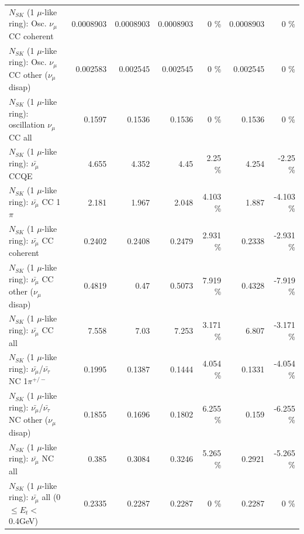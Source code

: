 \begin{table}
\begin{tabular}{| l | r | r | r  r | r  r |}
                        $N_{SK}$ (1 $\mu$-like ring): Osc. $\nu_\mu$ CC coherent &       0.0008903 &       0.0008903 &       0.0008903 &        0 \%  &       0.0008903 &        0 \%  \\ 
         $N_{SK}$ (1 $\mu$-like ring): Osc. $\nu_\mu$ CC other ($\nu_\mu$ disap) &        0.002583 &        0.002545 &        0.002545 &        0 \%  &        0.002545 &        0 \%  \\ 
                      $N_{SK}$ (1 $\mu$-like ring): oscillation $\nu_\mu$ CC all &          0.1597 &          0.1536 &          0.1536 &        0 \%  &          0.1536 &        0 \%  \\ 
\hline
\hline
                              $N_{SK}$ (1 $\mu$-like ring): $\bar{\nu_\mu}$ CCQE &           4.655 &           4.352 &            4.45 &     2.25 \%  &           4.254 &    -2.25 \%  \\ 
                         $N_{SK}$ (1 $\mu$-like ring): $\bar{\nu_\mu}$ CC 1$\pi$ &           2.181 &           1.967 &           2.048 &    4.103 \%  &           1.887 &   -4.103 \%  \\ 
                       $N_{SK}$ (1 $\mu$-like ring): $\bar{\nu_\mu}$ CC coherent &          0.2402 &          0.2408 &          0.2479 &    2.931 \%  &          0.2338 &   -2.931 \%  \\ 
        $N_{SK}$ (1 $\mu$-like ring): $\bar{\nu_\mu}$ CC other ($\nu_\mu$ disap) &          0.4819 &            0.47 &          0.5073 &    7.919 \%  &          0.4328 &   -7.919 \%  \\ 
                          $N_{SK}$ (1 $\mu$-like ring): $\bar{\nu_{\mu}}$ CC all &           7.558 &            7.03 &           7.253 &    3.171 \%  &           6.807 &   -3.171 \%  \\ 
\hline
  $N_{SK}$ (1 $\mu$-like ring): $\bar{\nu_\mu}$/$\bar{\nu_\tau}$ NC 1$\pi^{+/-}$ &          0.1995 &          0.1387 &          0.1444 &    4.054 \%  &          0.1331 &   -4.054 \%  \\ 
$N_{SK}$ (1 $\mu$-like ring): $\bar{\nu_\mu}$/$\bar{\nu_\tau}$ NC other ($\nu_\mu$ disap) &          0.1855 &          0.1696 &          0.1802 &    6.255 \%  &           0.159 &   -6.255 \%  \\ 
                          $N_{SK}$ (1 $\mu$-like ring): $\bar{\nu_{\mu}}$ NC all &           0.385 &          0.3084 &          0.3246 &    5.265 \%  &          0.2921 &   -5.265 \%  \\ 
\hline
   $N_{SK}$ (1 $\mu$-like ring): $\bar{\nu_{\mu}}$ all (0 $\leq E_{t} <$ 0.4GeV) &          0.2335 &          0.2287 &          0.2287 &        0 \%  &          0.2287 &        0 \%  \\ 

\end{tabular}
\end{table}
